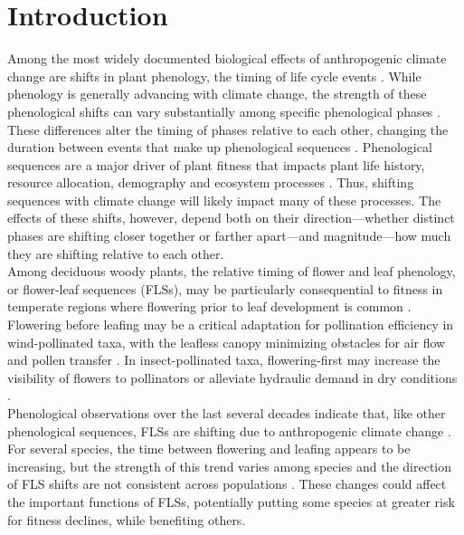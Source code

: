 \documentclass[11pt]{article}\usepackage[]{graphicx}\usepackage[]{color}
\begin{document}
\section*{Introduction}
\noindent Among the most widely documented biological effects of anthropogenic climate change are shifts in plant phenology, the timing of life cycle events \citep{Parmesan2003,Menzel2006,Cleland2007}. While phenology is generally advancing with climate change, the strength of these phenological shifts can vary substantially among specific phenological phases \citep{Augspurger:2020aa}. These differences alter the timing of phases relative to each other, changing the duration between events that make up phenological sequences \citep{Ettinger2018}. Phenological sequences are a major driver of plant fitness that impacts plant life history, resource allocation, demography and ecosystem processes \citep{Post:2008aa}. Thus, shifting sequences with climate change will likely impact many of these processes. The effects of these shifts, however, depend both on their direction---whether distinct phases are shifting closer together or farther apart---and magnitude---how much they are shifting relative to each other.\\ 

\noindent Among deciduous woody plants, the relative timing of flower and leaf phenology, or flower-leaf sequences (FLSs), may be particularly consequential to fitness in temperate regions where flowering prior to leaf development is common \citep{Rathcke_1985,Gougherty2018}. Flowering before leafing may be a critical adaptation for pollination efficiency in wind-pollinated taxa, with the leafless canopy minimizing obstacles for air flow and pollen transfer \citep{Whitehead1969}. In insect-pollinated taxa, flowering-first may increase the visibility of flowers to pollinators \citep{Janzen1967,Savage2019} or alleviate hydraulic demand in dry conditions \citep{Gougherty2018, Franklin2016}.\\

\noindent Phenological observations over the last several decades indicate that, like other phenological sequences, FLSs are shifting due to anthropogenic climate change \citep{Buonaiuto2020}. For several species, the time between flowering and leafing appears to be increasing, but the strength of this trend varies among species and the direction of FLS shifts are not consistent across populations \citep{Buonaiuto2020}. These changes could affect the important functions of FLSs, potentially putting some species at greater risk for fitness declines, while benefiting others.\\
\end{document}
